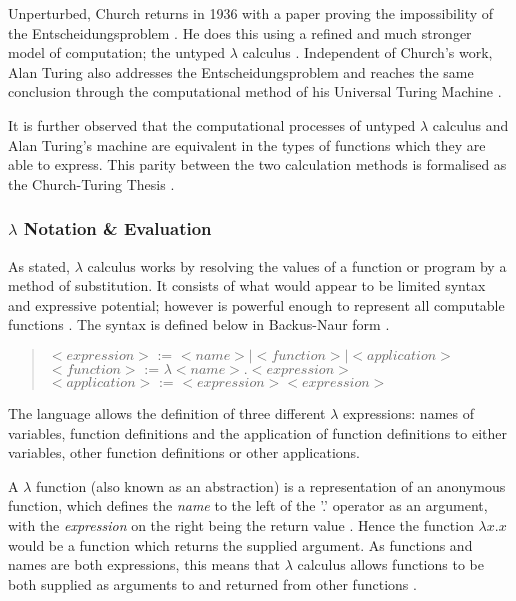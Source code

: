 \documentclass[12pt,a4paper]{article}
\begin{document}
Unperturbed, Church returns in 1936 with a paper proving the impossibility of the Entscheidungsproblem \cite{church1936,churchTuringThesis}. He does this using a refined and much stronger model of computation; the untyped $\lambda$ calculus \cite{church1936}. Independent of Church's work, Alan Turing also addresses the Entscheidungsproblem and reaches the same conclusion through the computational method of his Universal Turing Machine \cite{turing1936,churchTuringThesis}.

It is further observed that the computational processes of untyped $\lambda$ calculus and Alan Turing's machine are equivalent in the types of functions which they are able to express. This parity between the two calculation methods is formalised as the Church-Turing Thesis \cite{churchTuringThesis,ImperativeFunctional}.

\subsubsection{$\lambda$ Notation \& Evaluation}

As stated, $\lambda$ calculus works by resolving the values of a function or program by a method of substitution. It consists of what would appear to be limited syntax and expressive potential; however is powerful enough to represent all computable functions \cite{church1936}. The syntax is defined below in Backus-Naur form \cite{bnf}.

\begin{quote}
    {$<expression> \mbox{ := }  <name> | <function> | <application>$}
    {$<function> \mbox{ := } \lambda <name>.<expression>$}\newline
    {$<application> \mbox{ := } <expression><expression> $}\newline
\end{quote}

The language allows the definition of three different $\lambda$ expressions: names of variables, function definitions and the application of function definitions to either variables, other function definitions or other applications.

A $\lambda$ function (also known as an abstraction) is a representation of an anonymous function, which defines the \emph{name} to the left of the '.' operator as an argument, with the \emph{expression} on the right being the return value \cite{church1936}. Hence the function $\lambda x.x$ would be a function which returns the supplied argument. As functions and names are both expressions, this means that $\lambda$ calculus allows functions to be both supplied as arguments to and returned from other functions \cite{church1936}.
\end{document}
